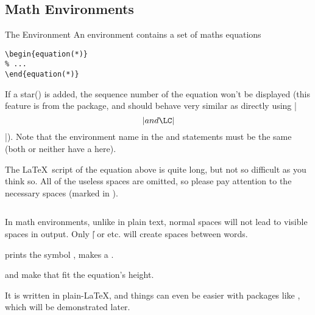 \subsection{Math Environments}


\begin{frame}[fragile]{The  Environment}
	An  environment contains a set of maths equations
	\begin{command}
		\begin{verbatim}
\begin{equation(*)}
% ...
\end{equation(*)}
		\end{verbatim}
	\end{command}
	\begin{example}
		
	\end{example}
	If a star(\structure{*}) is added, the sequence number of the equation won't be displayed (this feature is from the  package, and should behave very similar as directly using \LC|\[| and \LC|\]|). Note that the environment name in the \LC{\begin} and \LC{\end} statements must be the same (both or neither have a \structure{*} here).
\end{frame}

\begin{frame}[fragile]
	The \LaTeX\ script of the equation above is quite long, but not so difficult as you think so. All of the useless spaces are omitted, so please pay attention to the necessary spaces (marked in \textvisiblespace). \medskip

	\inputminted[showspaces]{latex}{../examples/curl.tex}
	
	In math environments, unlike in plain text, normal spaces will not lead to visible spaces in output. Only  \LC|\|\packagename{\textvisiblespace} or \LC{\quad,\qquad} etc. will create spaces between words. \medskip
	
	\LC{\partial} prints the symbol \structure{$\partial$},  makes a . \medskip
	
	\LC{\left(} and \LC{\right(} make  that fit the equation's height. \medskip
	
	It is written in plain-\LaTeX, and things can even be easier with packages like , which will be demonstrated later.
\end{frame}

